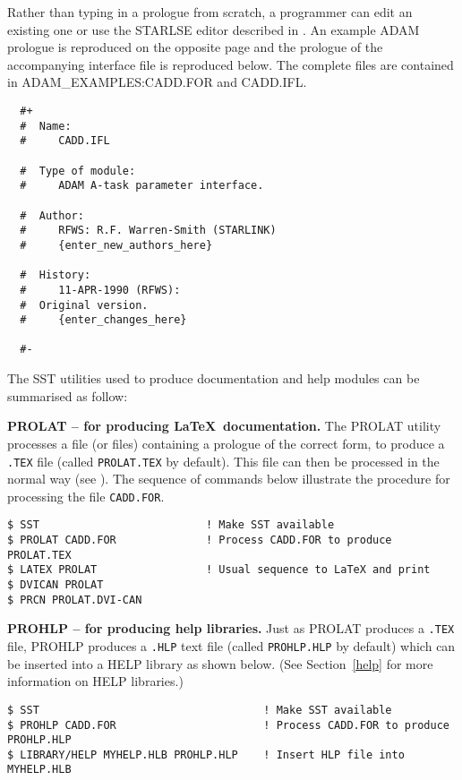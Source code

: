 Rather than typing in a prologue from scratch, a programmer can edit an 
existing one or use the STARLSE editor described in .
An example ADAM prologue is reproduced on the opposite page and the
prologue of the accompanying interface file is reproduced below.
The complete files are contained in ADAM\_EXAMPLES:CADD.FOR and 
{  CADD.IFL}.
\begin{verbatim}
  #+
  #  Name:
  #     CADD.IFL
  
  #  Type of module:
  #     ADAM A-task parameter interface.
  
  #  Author:
  #     RFWS: R.F. Warren-Smith (STARLINK)
  #     {enter_new_authors_here}
  
  #  History:
  #     11-APR-1990 (RFWS):
  #	 Original version.
  #     {enter_changes_here}
  
  #-
\end{verbatim}
The SST utilities used to produce documentation and help modules 
can be summarised as follow:
\begin{description}
\item{\bf PROLAT -- for producing \LaTeX\ documentation.}
The PROLAT utility processes a file (or files) containing a prologue 
of the correct form,
to produce a {\tt .TEX} file (called {\tt PROLAT.TEX} by default).
This file can then be processed in the normal way (see ).
The sequence of commands  below illustrate the procedure for processing 
the file {\tt CADD.FOR}.
\begin{verbatim}
$ SST                          ! Make SST available
$ PROLAT CADD.FOR              ! Process CADD.FOR to produce PROLAT.TEX
$ LATEX PROLAT                 ! Usual sequence to LaTeX and print
$ DVICAN PROLAT                
$ PRCN PROLAT.DVI-CAN          
\end{verbatim}
\item{\bf PROHLP -- for producing help libraries.} Just as PROLAT produces a 
{\tt .TEX} file, PROHLP produces a {\tt .HLP} text file (called 
{\tt PROHLP.HLP} by default) which can be inserted 
into a HELP library as shown below. (See Section~\ref{help} for more 
information on HELP libraries.)
\begin{verbatim}
$ SST                                   ! Make SST available
$ PROHLP CADD.FOR                       ! Process CADD.FOR to produce PROHLP.HLP
$ LIBRARY/HELP MYHELP.HLB PROHLP.HLP    ! Insert HLP file into MYHELP.HLB
\end{verbatim}
\end{description}
